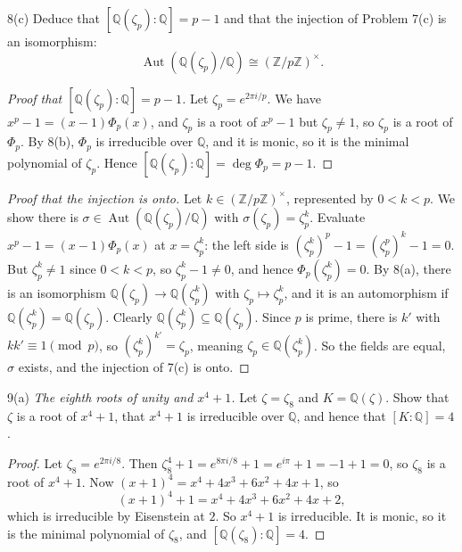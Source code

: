 \documentclass[11pt]{article}
\begin{document}
\begin{problem}{8(c)}
  Deduce that $[\mathbb{Q}(\zeta_p) : \mathbb{Q}] = p - 1$ and that the
  injection of Problem 7(c) is an isomorphism:
  \[
    \operatorname{Aut}(\mathbb{Q}(\zeta_p)/\mathbb{Q})
      \cong (\mathbb{Z}/p\mathbb{Z})^{\times} .
  \]
\end{problem}

\begin{proof}[Proof that {$[\mathbb{Q}(\zeta_p):\mathbb{Q}] = p-1$}]
Let $\zeta_p = e^{2\pi i/p}$. We have $x^p - 1 = (x-1)\Phi_p(x)$, and
$\zeta_p$ is a root of $x^p - 1$ but $\zeta_p \neq 1$, so $\zeta_p$ is a
root of $\Phi_p$. By 8(b), $\Phi_p$ is irreducible over $\mathbb{Q}$, and it
is monic, so it is the minimal polynomial of $\zeta_p$. Hence
$[\mathbb{Q}(\zeta_p):\mathbb{Q}] = \deg \Phi_p = p-1$.
\end{proof}

\begin{proof}[Proof that the injection is onto]
Let $k \in (\mathbb{Z}/p\mathbb{Z})^{\times}$, represented by $0 < k < p$.
We show there is $\sigma \in \operatorname{Aut}(\mathbb{Q}(\zeta_p)/\mathbb{Q})$
with $\sigma(\zeta_p) = \zeta_p^k$. Evaluate $x^p - 1 = (x-1)\Phi_p(x)$ at
$x = \zeta_p^k$: the left side is $(\zeta_p^k)^p - 1 = (\zeta_p^p)^k - 1 = 0$.
But $\zeta_p^k \neq 1$ since $0 < k < p$, so $\zeta_p^k - 1 \neq 0$, and hence
$\Phi_p(\zeta_p^k) = 0$. By 8(a), there is an isomorphism
$\mathbb{Q}(\zeta_p) \to \mathbb{Q}(\zeta_p^k)$ with $\zeta_p \mapsto \zeta_p^k$,
and it is an automorphism if $\mathbb{Q}(\zeta_p^k) = \mathbb{Q}(\zeta_p)$.
Clearly $\mathbb{Q}(\zeta_p^k) \subseteq \mathbb{Q}(\zeta_p)$. Since $p$ is
prime, there is $k'$ with $kk' \equiv 1 \pmod p$, so
$(\zeta_p^k)^{k'} = \zeta_p$, meaning $\zeta_p \in \mathbb{Q}(\zeta_p^k)$.
So the fields are equal, $\sigma$ exists, and the injection of 7(c) is onto.
\end{proof}

\begin{problem}{9(a)}
  \emph{The eighth roots of unity and $x^4 + 1$.} Let $\zeta = \zeta_8$ and
  $K = \mathbb{Q}(\zeta)$. Show that $\zeta$ is a root of $x^4 + 1$, that
  $x^4 + 1$ is irreducible over $\mathbb{Q}$, and hence that
  $[K : \mathbb{Q}] = 4$.
\end{problem}

\begin{proof}
Let $\zeta_8 = e^{2\pi i/8}$. Then
$\zeta_8^4 + 1 = e^{8\pi i/8} + 1 = e^{i\pi} + 1 = -1 + 1 = 0$, so $\zeta_8$
is a root of $x^4 + 1$. Now $(x+1)^4 = x^4 + 4x^3 + 6x^2 + 4x + 1$, so
\[
  (x+1)^4 + 1 = x^4 + 4x^3 + 6x^2 + 4x + 2,
\]
which is irreducible by Eisenstein at $2$. So $x^4 + 1$ is irreducible. It is
monic, so it is the minimal polynomial of $\zeta_8$, and
$[\mathbb{Q}(\zeta_8):\mathbb{Q}] = 4$.
\end{proof}
\end{document}

